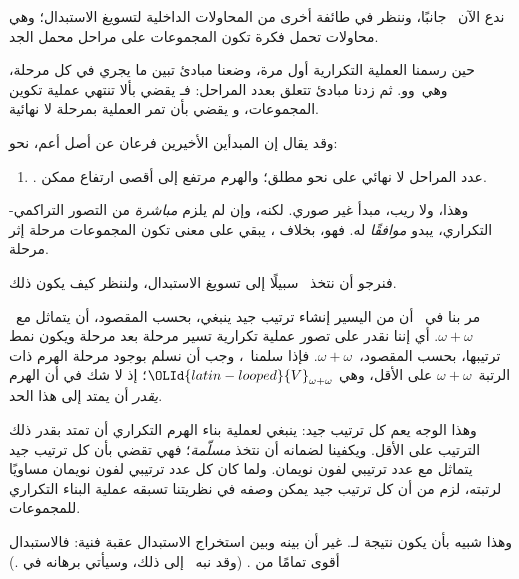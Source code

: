 \documentclass[../../../include/open-logic-section]{subfiles}
\begin{document}

ندع الآن~\limofsize{} جانبًا، وننظر في طائفة أخرى من المحاولات
الداخلية لتسويغ الاستبدال؛ وهي محاولات تحمل فكرة تكون المجموعات على
مراحل محمل الجد.

حين رسمنا العملية التكرارية أول مرة، وضعنا مبادئ تبين ما يجري في كل
مرحلة، وهي~\stageshier و\stagesord و\stagesacc. ثم زدنا مبادئ تتعلق
بعدد المراحل: فـ\stagessucc{} يقضي بألا تنتهي عملية تكوين المجموعات،
و\stagesinf{} يقضي بأن تمر العملية بمرحلة لا نهائية.

وقد يقال إن المبدأين الأخيرين فرعان عن أصل أعم، نحو:
\begin{enumerate}
	\item[] \stagesinex. عدد المراحل لا نهائي على نحو مطلق؛ والهرم
	مرتفع إلى أقصى ارتفاع ممكن.
\end{enumerate}
وهذا، ولا ريب، مبدأ غير صوري. لكنه، وإن لم يلزم \emph{مباشرة}
من التصور التراكمي-التكراري، يبدو \emph{موافقًا} له. فهو، بخلاف
\limofsize{}، يبقي على معنى تكون المجموعات مرحلة إثر مرحلة.

فنرجو أن نتخذ~\stagesinex{} سبيلًا إلى تسويغ الاستبدال، ولننظر كيف
يكون ذلك.

مر بنا في~ أن من اليسير إنشاء ترتيب جيد
ينبغي، بحسب المقصود، أن يتماثل مع~$\omega+\omega$. أي إننا نقدر على
تصور عملية تكرارية تسير مرحلة بعد مرحلة ويكون نمط ترتيبها، بحسب
المقصود،~$\omega+\omega$. فإذا سلمنا~\stagesinex، وجب أن نسلم بوجود
مرحلة الهرم ذات الرتبة~$\omega+\omega$ على الأقل، وهي
$\OLId{latin-looped}{V}_{\omega+\omega}$؛ إذ لا شك في أن الهرم \emph{يقدر} أن يمتد إلى
هذا الحد.

وهذا الوجه يعم كل ترتيب جيد: ينبغي لعملية بناء الهرم التكراري أن
تمتد بقدر ذلك الترتيب على الأقل. ويكفينا لضمانه أن نتخذ
 \emph{مسلّمة}؛
فهي تقضي بأن كل ترتيب جيد يتماثل مع عدد ترتيبي لفون نويمان. ولما كان
كل عدد ترتيبي لفون نويمان مساويًا لرتبته، لزم من
 أن كل ترتيب جيد
يمكن وصفه في نظريتنا تسبقه عملية البناء التكراري للمجموعات.

وهذا شبيه بأن يكون نتيجة لـ\stagesinex. غير أن بينه وبين استخراج
الاستبدال عقبة فنية: فالاستبدال أقوى تمامًا من
.
(وقد نبه~\citet[\S13.2]{Potter2004} إلى ذلك، وسيأتي برهانه في
.)
\end{document}
